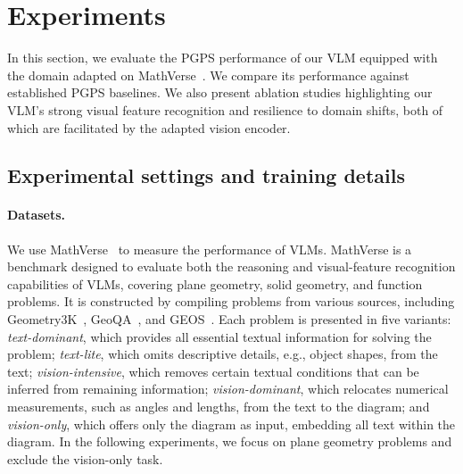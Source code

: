 \section{Experiments}

In this section, we evaluate the PGPS performance of our VLM equipped with the domain adapted \geoclip{} on MathVerse~\citep{mathverse}.
We compare its performance against established PGPS baselines. We also present ablation studies highlighting our VLM’s strong visual feature recognition and resilience to domain shifts, both of which are facilitated by the adapted vision encoder.

\subsection{Experimental settings and training details}




\paragraph{Datasets.}
We use MathVerse~\citep{mathverse} to measure the performance of VLMs.
MathVerse is a benchmark designed to evaluate both the reasoning and visual-feature recognition capabilities of VLMs, covering plane geometry, solid geometry, and function problems. It is constructed by compiling problems from various sources, including Geometry3K~\citep{intergps}, GeoQA~\citep{geoqa}, and GEOS~\citep{geos}. Each problem is presented in five variants: \emph{text-dominant}, which provides all essential textual information for solving the problem; \emph{text-lite}, which omits descriptive details, e.g., object shapes, from the text; \emph{vision-intensive}, which removes certain textual conditions that can be inferred from remaining information; \emph{vision-dominant}, which relocates numerical measurements, such as angles and lengths, from the text to the diagram; and \emph{vision-only}, which offers only the diagram as input, embedding all text within the diagram. In the following experiments, we focus on plane geometry problems and exclude the vision-only task.

